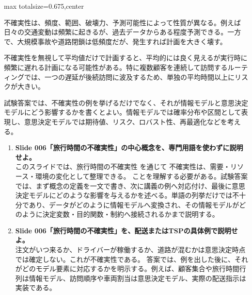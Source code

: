\begin{adjustbox}{max totalsize={\textwidth}{0.675\textheight},center}
\begin{minipage}{\textwidth}
\begin{minipage}[t]{0.485\textwidth}
不確実性は、頻度、範囲、破壊力、予測可能性によって性質が異なる。例えば日々の交通変動は頻繁に起きるが、過去データからある程度予測できる。一方で、大規模事故や道路閉鎖は低頻度だが、発生すれば計画を大きく壊す。\par
不確実性を無視して平均値だけで計画すると、平均的には良く見えるが実行時に頻繁に遅れる計画になる可能性がある。特に複数顧客を連続して訪問するルーティングでは、一つの遅延が後続訪問に波及するため、単独の平均時間以上にリスクが大きい。\par
試験答案では、不確実性の例を挙げるだけでなく、それが情報モデルと意思決定モデルにどう影響するかを書くとよい。情報モデルでは確率分布や区間として表現し、意思決定モデルでは期待値、リスク、ロバスト性、再最適化などを考える。\par
{}
\begin{enumerate}
\item \textbf{Slide 006「旅行時間の不確実性」の中心概念を、専門用語を使わずに説明せよ。}\\このスライドでは、旅行時間の不確実性 を通じて 不確実性は、需要・リソース・環境の変化として整理できる。 ことを理解する必要がある。試験答案では、まず概念の定義を一文で書き、次に講義の例へ対応付け、最後に意思決定モデルにどのような影響を与えるかを述べる。単語の列挙だけでは不十分であり、データがどのように情報モデルへ変換され、その情報モデルがどのように決定変数・目的関数・制約へ接続されるかまで説明する。
\item \textbf{Slide 006「旅行時間の不確実性」を、配送またはTSPの具体例で説明せよ。}\\注文がいつ来るか、ドライバーが稼働するか、道路が混むかは意思決定時点では確定しない。これが不確実性である。 答案では、例を出した後に、それがどのモデル要素に対応するかを明示する。例えば、顧客集合や旅行時間行列は情報モデル、訪問順序や車両割当は意思決定モデル、実際の配送指示は実装である。
\end{enumerate}
\end{minipage}
\end{minipage}
\end{adjustbox}

